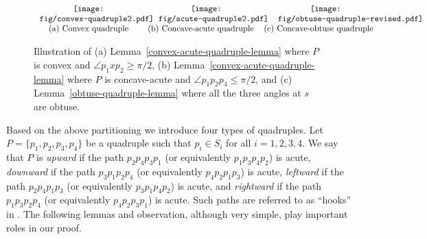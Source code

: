 \documentclass[11pt,letter]{article}
\begin{document}
\begin{figure}[htb]
	\centering
	\setlength{\tabcolsep}{0in}
	$\begin{tabular}{ccc}
		\multicolumn{1}{m{.34\columnwidth}}{\centering\texttt{[image: fig/convex-quadruple2.pdf]}}
		&\multicolumn{1}{m{.33\columnwidth}}{\centering\vspace{0pt}\texttt{[image: fig/acute-quadruple2.pdf]}}
		&\multicolumn{1}{m{.33\columnwidth}}{\centering\vspace{0pt}\texttt{[image: fig/obtuse-quadruple-revised.pdf]}}
		\\
		(a) Convex quadruple&(b) Concave-acute quadruple &(c) Concave-obtuse quadruple
	\end{tabular}$
	\caption{Illustration of (a) Lemma~\ref{convex-acute-quadruple-lemma} where $P$ is convex and $\angle p_1xp_2\geqslant \pi/2$, (b) Lemma~\ref{convex-acute-quadruple-lemma} where $P$ is concave-acute and $\angle p_1p_2p_4\leqslant \pi/2$, and (c) Lemma~\ref{obtuse-quadruple-lemma} where all the three angles at $s$ are obtuse.}
	\label{hook-fig}
\end{figure}

Based on the above partitioning we introduce four types of quadruples. Let $P=\{p_1,p_2,p_3,p_4\}$ be a quadruple such that $p_i\in S_i$ for all $i=1,2,3,4$. We say that $P$ is {\em upward} if the path $p_2p_4p_3p_1$ (or equivalently $p_1p_3p_4p_2$) is acute, {\em downward} if the path $p_3p_1p_2p_4$ (or equivalently $p_4p_2p_1p_3$) is acute, {\em leftward} if the path $p_2p_4p_1p_3$ (or equivalently $p_3p_1p_4p_2$) is acute, and {\em rightward} if the path $p_1p_3p_2p_4$ (or equivalently $p_4p_2p_3p_1$) is acute. Such paths are referred to as ``hooks'' in \cite{Dumitrescu12}.
The following lemmas and observation, although very simple, play important roles in our proof. 
\end{document}
